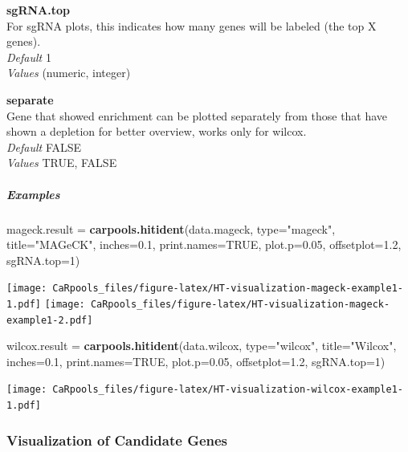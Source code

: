 \documentclass[]{article}
\newenvironment{Shaded}{\begin{snugshade}}{\end{snugshade}}
\newcommand{\KeywordTok}[1]{\textcolor[rgb]{0.13,0.29,0.53}{\textbf{{#1}}}}
\newcommand{\DataTypeTok}[1]{\textcolor[rgb]{0.13,0.29,0.53}{{#1}}}
\newcommand{\DecValTok}[1]{\textcolor[rgb]{0.00,0.00,0.81}{{#1}}}
\newcommand{\FloatTok}[1]{\textcolor[rgb]{0.00,0.00,0.81}{{#1}}}
\newcommand{\StringTok}[1]{\textcolor[rgb]{0.31,0.60,0.02}{{#1}}}
\newcommand{\OtherTok}[1]{\textcolor[rgb]{0.56,0.35,0.01}{{#1}}}
\newcommand{\NormalTok}[1]{{#1}}
\let\oldsubparagraph\subparagraph
\renewcommand{\subparagraph}[1]{\oldsubparagraph{#1}\mbox{}}
\begin{document}
\textbf{sgRNA.top}\\
For sgRNA plots, this indicates how many genes will be labeled (the top
X genes).\\
\emph{Default} 1\\
\emph{Values} (numeric, integer)

\textbf{separate}\\
Gene that showed enrichment can be plotted separately from those that
have shown a depletion for better overview, works only for wilcox.\\
\emph{Default} FALSE\\
\emph{Values} TRUE, FALSE

\subparagraph{Examples}\label{examples}

\begin{Shaded}
\begin{Highlighting}[]
\NormalTok{mageck.result =}\StringTok{ }\KeywordTok{carpools.hitident}\NormalTok{(data.mageck, }\DataTypeTok{type=}\StringTok{"mageck"}\NormalTok{, }\DataTypeTok{title=}\StringTok{"MAGeCK"}\NormalTok{, }\DataTypeTok{inches=}\FloatTok{0.1}\NormalTok{, }\DataTypeTok{print.names=}\OtherTok{TRUE}\NormalTok{, }\DataTypeTok{plot.p=}\FloatTok{0.05}\NormalTok{, }\DataTypeTok{offsetplot=}\FloatTok{1.2}\NormalTok{, }\DataTypeTok{sgRNA.top=}\DecValTok{1}\NormalTok{)}
\end{Highlighting}
\end{Shaded}

\texttt{[image: CaRpools\_files/figure-latex/HT-visualization-mageck-example1-1.pdf]}
\texttt{[image: CaRpools\_files/figure-latex/HT-visualization-mageck-example1-2.pdf]}

\begin{Shaded}
\begin{Highlighting}[]
\NormalTok{wilcox.result =}\StringTok{ }\KeywordTok{carpools.hitident}\NormalTok{(data.wilcox, }\DataTypeTok{type=}\StringTok{"wilcox"}\NormalTok{, }\DataTypeTok{title=}\StringTok{"Wilcox"}\NormalTok{, }\DataTypeTok{inches=}\FloatTok{0.1}\NormalTok{, }\DataTypeTok{print.names=}\OtherTok{TRUE}\NormalTok{, }\DataTypeTok{plot.p=}\FloatTok{0.05}\NormalTok{, }\DataTypeTok{offsetplot=}\FloatTok{1.2}\NormalTok{, }\DataTypeTok{sgRNA.top=}\DecValTok{1}\NormalTok{)}
\end{Highlighting}
\end{Shaded}

\texttt{[image: CaRpools\_files/figure-latex/HT-visualization-wilcox-example1-1.pdf]}

\subsubsection{Visualization of Candidate
Genes}\label{visualization-of-candidate-genes}
\end{document}
